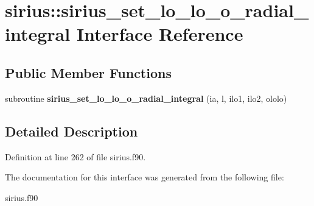 \hypertarget{interfacesirius_1_1sirius__set__lo__lo__o__radial__integral}{}\section{sirius\+:\+:sirius\+\_\+set\+\_\+lo\+\_\+lo\+\_\+o\+\_\+radial\+\_\+integral Interface Reference}
\label{interfacesirius_1_1sirius__set__lo__lo__o__radial__integral}
\subsection*{Public Member Functions}
\begin{DoxyCompactItemize}
\item 
\hypertarget{interfacesirius_1_1sirius__set__lo__lo__o__radial__integral_a458d66c7a7f8f37dff106411f009f930}{}subroutine {\bfseries sirius\+\_\+set\+\_\+lo\+\_\+lo\+\_\+o\+\_\+radial\+\_\+integral} (ia, l, ilo1, ilo2, ololo)\label{interfacesirius_1_1sirius__set__lo__lo__o__radial__integral_a458d66c7a7f8f37dff106411f009f930}

\end{DoxyCompactItemize}


\subsection{Detailed Description}


Definition at line 262 of file sirius.\+f90.



The documentation for this interface was generated from the following file\+:\begin{DoxyCompactItemize}
\item 
sirius.\+f90\end{DoxyCompactItemize}
